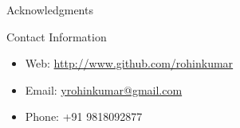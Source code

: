 \documentclass[final,hyperref={pdfpagelabels=false}]{beamer}
\begin{document}
\begin{frame}[t]
\begin{columns}[t]
\begin{column}{.465\textwidth}
\begin{block}{Acknowledgments}
\end{block}



\begin{block}{Contact Information}

\begin{itemize}
\item Web: \href{http://www.github.com/rohinkumar}{http://www.github.com/rohinkumar}
\item Email: \href{mailto:yrohinkumar@gmail.com}{yrohinkumar@gmail.com}
\item Phone: +91 9818092877
\end{itemize}

\end{block}


\end{column} %

\begin{column}{.015\textwidth}\end{column} %

\end{columns} %

\end{frame} %
\end{document}
